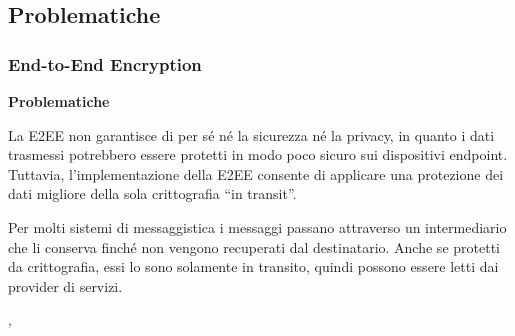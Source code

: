 \subsection{Problematiche}

\begin{frame}
    \frametitle{End-to-End Encryption}
    \textbf{Problematiche}\newline

    La E2EE non garantisce di per sé né la sicurezza né la privacy, in quanto i dati trasmessi potrebbero essere protetti in modo poco sicuro sui dispositivi endpoint.\newline
    Tuttavia, l'implementazione della E2EE consente di applicare una protezione dei dati migliore della sola crittografia ``in transit''.\newline\pause

    Per molti sistemi di messaggistica i messaggi passano attraverso un intermediario che li conserva finché non vengono recuperati dal destinatario. Anche se protetti da crittografia, essi lo sono solamente in transito, quindi possono essere letti dai provider di servizi. 

    \cite{intransitEncryption}, \cite{IBM}

\end{frame}

